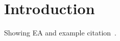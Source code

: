 %
%

\chapter{Introduction}
\label{chap:intro}

Showing \ac{EA} and example citation~\cite[p. 23]{Murphy12}.
